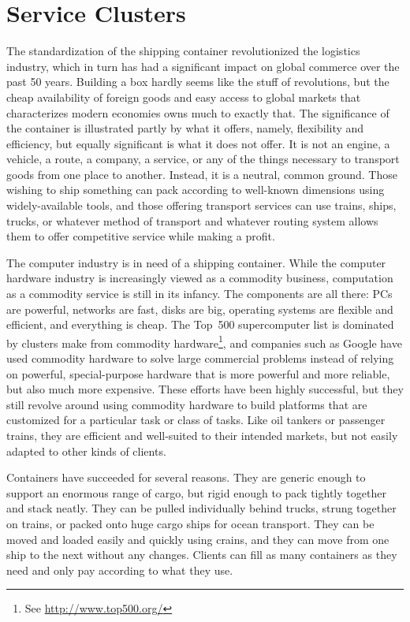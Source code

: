 \chapter{Service Clusters}

The standardization of the shipping container revolutionized the logistics industry, which in turn has had a significant impact on global commerce over the past 50 years. Building a box hardly seems like the stuff of revolutions, but the cheap availability of foreign goods and easy access to global markets that characterizes modern economies owns much to exactly that. The significance of the container is illustrated partly by what it offers, namely, flexibility and efficiency, but equally significant is what it does not offer. It is not an engine, a vehicle, a route, a company, a service, or any of the things necessary to transport goods from one place to another. Instead, it is a neutral, common ground. Those wishing to ship something can pack according to well-known dimensions using widely-available tools, and those offering transport services can use trains, ships, trucks, or whatever method of transport and whatever routing system allows them to offer competitive service while making a profit.

The computer industry is in need of a shipping container. While the computer hardware industry is increasingly viewed as a commodity business, computation as a commodity service is still in its infancy. The components are all there: PCs are powerful, networks are fast, disks are big, operating systems are flexible and efficient, and everything is cheap. The Top~500 supercomputer list is dominated by clusters make from commodity hardware\footnote{See \url{http://www.top500.org/}}, and companies such as Google have used commodity hardware to solve large commercial problems instead of relying on powerful, special-purpose hardware that is more powerful and more reliable, but also much more expensive. These efforts have been highly successful, but they still revolve around using commodity hardware to build platforms that are customized for a particular task or class of tasks. Like oil tankers or passenger trains, they are efficient and well-suited to their intended markets, but not easily adapted to other kinds of clients.

Containers have succeeded for several reasons. They are generic enough to support an enormous range of cargo, but rigid enough to pack tightly together and stack neatly. They can be pulled individually behind trucks, strung together on trains, or packed onto huge cargo ships for ocean transport. They can be moved and loaded easily and quickly using crains, and they can move from one ship to the next without any changes. Clients can fill as many containers as they need and only pay according to what they use.

